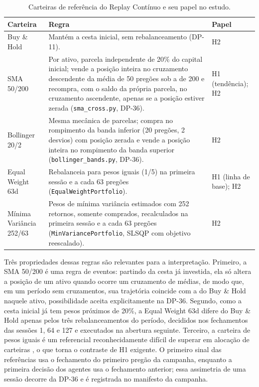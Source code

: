 \documentclass{eic-bcc-tcc}
\begin{document}
\begin{table}[htbp]
\centering
\caption{Carteiras de referência do Replay Contínuo e seu papel no estudo.}
\label{tab:met-referencias}
\small
\begin{tabular}{>{\raggedright\arraybackslash}p{2.8cm} >{\raggedright\arraybackslash}p{8.6cm} >{\raggedright\arraybackslash}p{3.4cm}}
\toprule
\textbf{Carteira} & \textbf{Regra} & \textbf{Papel} \\
\midrule
Buy \& Hold & Mantém a cesta inicial, sem rebalanceamento (DP-11). & H2 \\
SMA 50/200 & Por ativo, parcela independente de 20\% do capital inicial; vende a posição inteira no cruzamento descendente da média de 50 pregões sob a de 200 e recompra, com o saldo da própria parcela, no cruzamento ascendente, apenas se a posição estiver zerada (\texttt{sma\_cross.py}, DP-36). & H1 (tendência); H2 \\
Bollinger 20/2 & Mesma mecânica de parcelas; compra no rompimento da banda inferior (20 pregões, 2 desvios) com posição zerada e vende a posição inteira no rompimento da banda superior (\texttt{bollinger\_bands.py}, DP-36). & H2 \\
Equal Weight 63d & Rebalanceia para pesos iguais (1/5) na primeira sessão e a cada 63 pregões (\texttt{EqualWeightPortfolio}). & H1 (linha de base); H2 \\
Mínima Variância 252/63 & Pesos de mínima variância estimados com 252 retornos, somente comprados, recalculados na primeira sessão e a cada 63 pregões (\texttt{MinVariancePortfolio}, SLSQP com objetivo reescalado). & H2 \\
\bottomrule
\end{tabular}
\end{table}

Três propriedades dessas regras são relevantes para a interpretação. Primeiro, a SMA 50/200 é uma regra de eventos: partindo da cesta já investida, ela só altera a posição de um ativo quando ocorre um cruzamento de médias, de modo que, em um período sem cruzamentos, sua trajetória coincide com a do Buy \& Hold naquele ativo, possibilidade aceita explicitamente na DP-36. Segundo, como a cesta inicial já tem pesos próximos de 20\%, a Equal Weight 63d difere do Buy \& Hold apenas pelos três rebalanceamentos do período, decididos nos fechamentos das sessões 1, 64 e 127 e executados na abertura seguinte. Terceiro, a carteira de pesos iguais é um referencial reconhecidamente difícil de superar em alocação de carteiras \citep{DeMiguel2009}, o que torna o contraste de H1 exigente. O primeiro sinal das referências usa o fechamento do primeiro pregão da campanha, enquanto a primeira decisão dos agentes usa o fechamento anterior; essa assimetria de uma sessão decorre da DP-36 e é registrada no manifesto da campanha.
\end{document}
